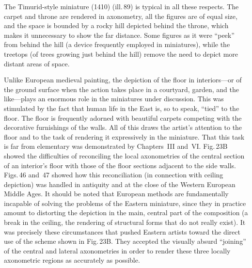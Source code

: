 

The Timurid-style miniature (1410) (ill.\,89) is typical in all these respects.
The carpet and throne are rendered in axonometry, all the figures are of equal
size, and the space is bounded by a rocky hill depicted behind the throne, which
makes it unnecessary to show the far distance. Some figures as it were ``peek''
from behind the hill (a device frequently employed in miniatures), while the
treetops (of trees growing just behind the hill) remove the need to depict more
distant areas of space.


Unlike European medieval painting, the depiction of the floor in interiors---or of
the ground surface when the action takes place in a courtyard, garden, and the
like---plays an enormous role in the miniatures under discussion. This was
stimulated by the fact that human life in the East is, so to speak, ``tied'' to the
floor. The floor is frequently adorned with beautiful carpets competing with the
decorative furnishings of the walls. All of this draws the artist's attention to the
floor and to the task of rendering it expressively in the miniature. That this task
is far from elementary was demonstrated by Chapters~III and~VI. Fig.\,23B showed
the difficulties of reconciling the local axonometries of the central section of an
interior's floor with those of the floor sections adjacent to the side walls.
Figs.\,46 and~47 showed how this reconciliation (in connection with ceiling
depiction) was handled in antiquity and at the close of the Western European Middle
Ages. It should be noted that European methods are fundamentally incapable of
solving the problems of the Eastern miniature, since they in practice amount to
distorting the depiction in the main, central part of the composition (a break in
the ceiling, the rendering of structural forms that do not really exist). It was
precisely these circumstances that pushed Eastern artists toward the direct use of
the scheme shown in Fig.\,23B. They accepted the visually absurd ``joining'' of the
central and lateral axonometries in order to render these three locally axonometric
regions as accurately as possible.



